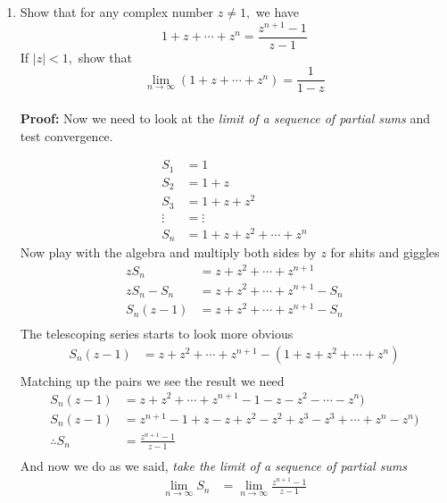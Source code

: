 \begin{enumerate}
	\item Show that for any complex number $z \neq 1,$ we have
	      \[ 1 + z + \cdots + z^n = \frac{z^{n + 1} - 1}{z - 1}\]
	      If $|z| < 1,$ show that
	      \[ \lim_{n \to \infty} (1 + z + \cdots + z^n ) = \frac{1}{1 - z} \] \\

	      \textbf{Proof:}
	      Now we need to look at the \textit{limit of a sequence of partial sums} and test convergence.

	      \begin{align*}
		      S_1    & = 1                          \\
		      S_2    & = 1 + z                      \\
		      S_3    & = 1 + z + z^2                \\
		      \vdots & = \vdots                     \\
		      S_n    & = 1 + z + z^2 + \cdots + z^n
	      \end{align*}
	      Now play with the algebra and multiply both sides by $z$ for shits and giggles
	      \begin{align*}
		      zS_n       & = z + z^2 + \cdots + z^{n +1}       \\
		      zS_n - S_n & = z + z^2 + \cdots + z^{n +1} - S_n \\
		      S_n(z - 1) & = z + z^2 + \cdots + z^{n +1} - S_n \\
	      \end{align*}
	      The telescoping series starts to look more obvious
	      \begin{align*}
		      S_n(z - 1) & = z + z^2 + \cdots + z^{n +1} - (1 + z + z^2 + \cdots + z^n) \\
	      \end{align*}
	      Matching up the pairs we see the result we need
	      \begin{align*}
		      S_n(z - 1)     & = z + z^2 + \cdots + z^{n +1} - 1 - z - z^2 - \cdots - z^n)          \\
		      S_n(z - 1)     & = z^{n +1} - 1 + z - z + z^2 - z^2 + z^3 - z^3 + \cdots + z^n - z^n) \\
		      \therefore S_n & = \frac{z^{n +1} - 1}{z - 1}                                         \\
	      \end{align*}
	      And now we do as we said, \textit{take the limit of a sequence of partial sums}
	      \begin{align*}
		      \lim_{n \to \infty} S_n & = \lim_{n \to \infty} \frac{z^{n +1} - 1}{z - 1} \\
	      \end{align*}


\end{enumerate}
